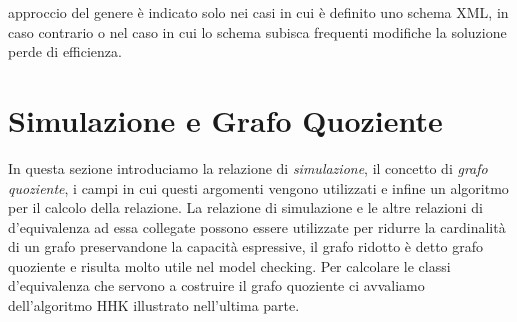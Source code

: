 \documentclass[12pt,a4paper,openright,twoside]{report}
\theoremstyle{definition}
\begin{document}
approccio del genere è indicato solo nei casi in cui è definito uno schema XML, in caso contrario o nel caso in cui lo schema subisca frequenti modifiche la soluzione perde di efficienza.

\newpage
\section{Simulazione e Grafo Quoziente}
In questa sezione introduciamo la relazione di \emph{simulazione}, il concetto di \emph{grafo quoziente}, i campi in cui questi argomenti vengono utilizzati e infine un algoritmo per il calcolo della relazione. La relazione di simulazione e le altre relazioni di d'equivalenza ad essa collegate possono essere utilizzate per ridurre la cardinalità di un grafo preservandone la capacità espressive, il grafo ridotto è detto grafo quoziente e risulta molto utile nel model checking. Per calcolare le classi d'equivalenza che servono a costruire il grafo quoziente ci avvaliamo dell'algoritmo HHK illustrato nell'ultima parte.
\end{document}
